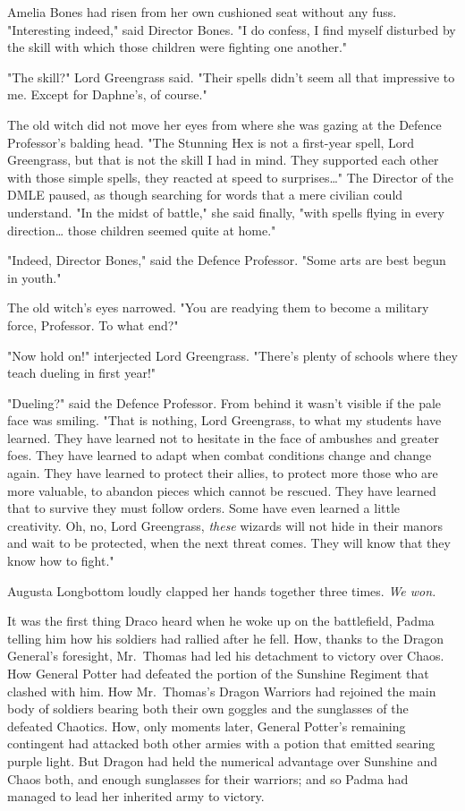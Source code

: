 Amelia Bones had risen from her own cushioned seat without any fuss.
"Interesting indeed," said Director Bones. "I do confess, I find myself
disturbed by the skill with which those children were fighting one another."

"The skill?" Lord Greengrass said. "Their spells didn't seem all that
impressive to me. Except for Daphne's, of course."

The old witch did not move her eyes from where she was gazing at the Defence
Professor's balding head. "The Stunning Hex is not a first-year spell, Lord
Greengrass, but that is not the skill I had in mind. They supported each other
with those simple spells, they reacted at speed to surprises{\ldots}" The
Director of the DMLE paused, as though searching for words that a mere civilian
could understand. "In the midst of battle," she said finally, "with spells
flying in every direction{\ldots} those children seemed quite at home."

"Indeed, Director Bones," said the Defence Professor. "Some arts are best begun
in youth."

The old witch's eyes narrowed. "You are readying them to become a military
force, Professor. To what end?"

"Now hold on!" interjected Lord Greengrass. "There's plenty of schools where
they teach dueling in first year!"

"Dueling?" said the Defence Professor. From behind it wasn't visible if the
pale face was smiling. "That is nothing, Lord Greengrass, to what my students
have learned. They have learned not to hesitate in the face of ambushes and
greater foes. They have learned to adapt when combat conditions change and
change again. They have learned to protect their allies, to protect more those
who are more valuable, to abandon pieces which cannot be rescued. They have
learned that to survive they must follow orders. Some have even learned a
little creativity. Oh, no, Lord Greengrass, \emph{these} wizards will not hide
in their manors and wait to be protected, when the next threat comes. They will
know that they know how to fight."

Augusta Longbottom loudly clapped her hands together three times.
\later
\emph{We won.}

It was the first thing Draco heard when he woke up on the battlefield, Padma
telling him how his soldiers had rallied after he fell. How, thanks to the
Dragon General's foresight, Mr.~Thomas had led his detachment to victory over
Chaos. How General Potter had defeated the portion of the Sunshine Regiment
that clashed with him. How Mr.~Thomas's Dragon Warriors had rejoined the main
body of soldiers bearing both their own goggles and the sunglasses of the
defeated Chaotics. How, only moments later, General Potter's remaining
contingent had attacked both other armies with a potion that emitted searing
purple light. But Dragon had held the numerical advantage over Sunshine and
Chaos both, and enough sunglasses for their warriors; and so Padma had managed
to lead her inherited army to victory.

